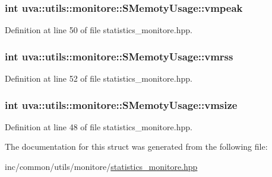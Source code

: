 \subsubsection[{vmpeak}]{\setlength{\rightskip}{0pt plus 5cm}int uva\+::utils\+::monitore\+::\+S\+Memoty\+Usage\+::vmpeak}\label{structuva_1_1utils_1_1monitore_1_1_s_memoty_usage_a8242cff8c7bf0ca9c340562eff5e2e97}


Definition at line 50 of file statistics\+\_\+monitore.\+hpp.

\hypertarget{structuva_1_1utils_1_1monitore_1_1_s_memoty_usage_a9113a20622f78f89e697550039291c20}{}
\subsubsection[{vmrss}]{\setlength{\rightskip}{0pt plus 5cm}int uva\+::utils\+::monitore\+::\+S\+Memoty\+Usage\+::vmrss}\label{structuva_1_1utils_1_1monitore_1_1_s_memoty_usage_a9113a20622f78f89e697550039291c20}


Definition at line 52 of file statistics\+\_\+monitore.\+hpp.

\hypertarget{structuva_1_1utils_1_1monitore_1_1_s_memoty_usage_adaa0855e2993c6364c8b5891e63dbff4}{}
\subsubsection[{vmsize}]{\setlength{\rightskip}{0pt plus 5cm}int uva\+::utils\+::monitore\+::\+S\+Memoty\+Usage\+::vmsize}\label{structuva_1_1utils_1_1monitore_1_1_s_memoty_usage_adaa0855e2993c6364c8b5891e63dbff4}


Definition at line 48 of file statistics\+\_\+monitore.\+hpp.



The documentation for this struct was generated from the following file\+:\begin{DoxyCompactItemize}
\item 
inc/common/utils/monitore/\hyperlink{statistics__monitore_8hpp}{statistics\+\_\+monitore.\+hpp}\end{DoxyCompactItemize}
